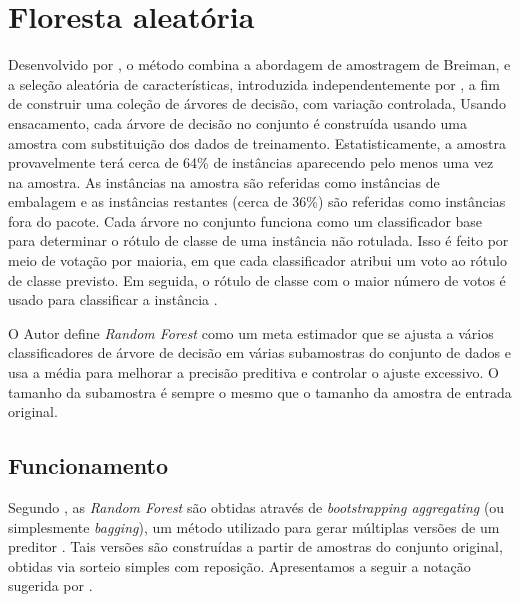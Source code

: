 \section{Floresta aleatória}

Desenvolvido por \cite{breiman2001random}, o método combina a abordagem de amostragem de Breiman, e a seleção aleatória de características, introduzida independentemente por \cite{ho1995random} \cite{amit1997shape}, a fim de construir uma coleção de árvores de decisão, com variação controlada, Usando ensacamento, cada árvore de decisão no conjunto é construída usando uma amostra com substituição dos dados de treinamento. Estatisticamente, a amostra provavelmente terá cerca de 64\% de instâncias aparecendo pelo menos uma vez na amostra. As instâncias na amostra são referidas como instâncias de embalagem e as instâncias restantes (cerca de 36\%) são referidas como instâncias fora do pacote. Cada árvore no conjunto funciona como um classificador base para determinar o rótulo de classe de uma instância não rotulada. Isso é feito por meio de votação por maioria, em que cada classificador atribui um voto ao rótulo de classe previsto. Em seguida, o rótulo de classe com o maior número de votos é usado para classificar a instância \cite{fawagreh2014random}.

O Autor \cite{scikitlearn} define \textit{Random Forest} como um meta estimador que se ajusta a vários classificadores de árvore de decisão em várias subamostras do conjunto de dados e usa a média para melhorar a precisão preditiva e controlar o ajuste excessivo. O tamanho da subamostra é sempre o mesmo que o tamanho da amostra de entrada original.

\subsection{Funcionamento}

Segundo \cite{bastos2013proposta}, as \textit{Random Forest} são obtidas através de \textit{bootstrapping aggregating} (ou simplesmente \textit{bagging}), um método utilizado para gerar múltiplas versões de um preditor \cite{breiman1996bagging}. Tais versões são construídas a partir de amostras do conjunto original, obtidas via sorteio simples com reposição. Apresentamos a seguir a notação sugerida por \cite{breiman2001random}. 

